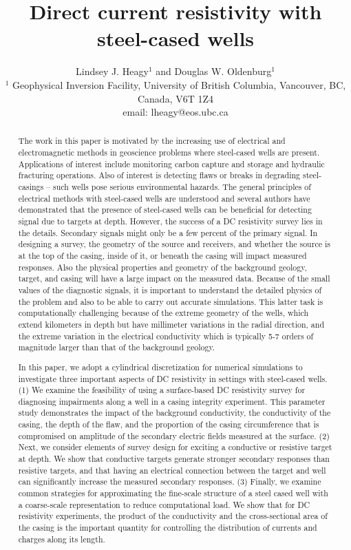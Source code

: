 \documentclass[extra,mreferee]{gji}
\title{
  Direct current resistivity with steel-cased wells
}
\author[Lindsey J. Heagy, Douglas W. Oldenburg]{
  Lindsey J. Heagy$^1$ and Douglas W. Oldenburg$^1$\\
  $^1$ Geophysical Inversion Facility, University of British Columbia, Vancouver, BC, Canada, V6T 1Z4
  \\ \quad email: lheagy@eos.ubc.ca
}
\begin{document}
\label{firstpage}

\maketitle

\begin{abstract}

The work in this paper is motivated by the increasing use of electrical and electromagnetic methods in geoscience problems where steel-cased wells are present. Applications of interest include monitoring carbon capture and storage and hydraulic fracturing operations. Also of interest is detecting flaws or breaks in degrading steel-casings -- such wells pose serious environmental hazards. The general principles of electrical methods with steel-cased wells are understood and several authors have demonstrated that the presence of steel-cased wells can be beneficial for detecting signal due to targets at depth. However, the success of a DC resistivity survey lies in the details. Secondary signals might only be a few percent of the primary signal. In designing a survey, the geometry of the source and receivers, and whether the source is at the top of the casing, inside of it, or beneath the casing will impact measured responses. Also  the physical properties and geometry of the background geology, target, and casing will have a large impact on the measured data. Because of the small values of the diagnostic signals, it is important to understand the detailed physics of the problem and also to be able to carry out accurate simulations. This latter task is computationally challenging because of the extreme geometry of the wells, which extend kilometers in depth but have millimeter variations in the radial direction, and the extreme variation in the electrical conductivity which is typically 5-7 orders of magnitude larger than that of the  background geology.

In this paper, we adopt a cylindrical discretization for numerical simulations to investigate three important aspects of DC resistivity in settings with steel-cased wells. (1) We examine the feasibility of using a surface-based DC resistivity survey for diagnosing impairments along a well in a casing integrity experiment. This parameter study demonstrates the impact of the background conductivity, the conductivity of the casing, the depth of the flaw, and the proportion of the casing circumference that is compromised on amplitude of the secondary electric fields measured at the surface. (2) Next, we consider elements of survey design for exciting a conductive or resistive target at depth. We show that conductive targets generate stronger secondary responses than resistive targets, and that having an electrical connection between the target and well can significantly increase the measured secondary responses. (3) Finally, we examine common strategies for approximating the fine-scale structure of a steel cased well with a coarse-scale representation to reduce computational load. We show that for DC resistivity experiments, the product of the conductivity and the cross-sectional area of the casing is the important quantity for controlling the distribution of currents and charges along its length.


\end{abstract}
\end{document}
